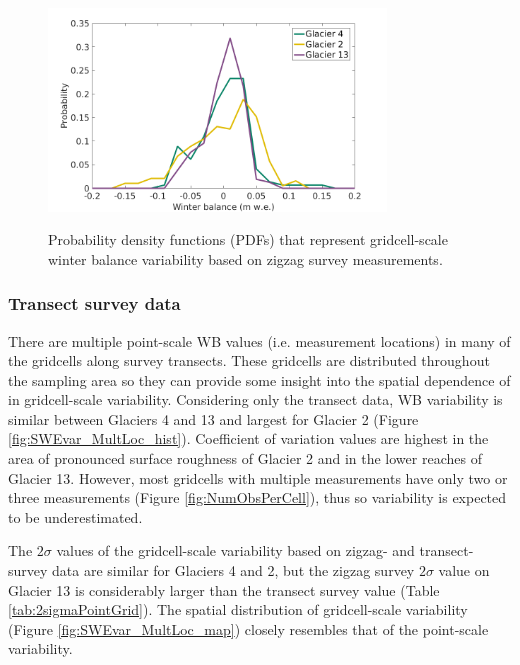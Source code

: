 \documentclass{sfuthesis}
\begin{document}
{\begin{figure}[H]
	\centering
	\includegraphics[width =0.8\textwidth]{ZigzagPDF_G.png}\\
	\caption{Probability density functions (PDFs) that represent gridcell-scale winter balance variability based on zigzag survey measurements.}
	\label{fig:SWEvar_ZZG_hist}
\end{figure}

\subsubsection{Transect survey data}
There are multiple point-scale WB values (i.e. measurement locations) in many of the gridcells along survey transects. These gridcells are distributed throughout the sampling area so they can provide some insight into the spatial dependence of in gridcell-scale variability. Considering only the transect data, WB variability is similar between Glaciers 4 and 13 and largest for Glacier 2 (Figure \ref{fig:SWEvar_MultLoc_hist}). Coefficient of variation values are highest in the area of pronounced surface roughness of Glacier 2 and in the lower reaches of Glacier 13.  However, most gridcells with multiple measurements have only two or three measurements (Figure \ref{fig:NumObsPerCell}), thus so variability is expected to be underestimated. 

The $2\sigma$ values of the gridcell-scale variability based on zigzag- and transect-survey data are similar for Glaciers 4 and 2, but the zigzag survey $2\sigma$ value on Glacier 13 is considerably larger than the transect survey value (Table  \ref{tab:2sigmaPointGrid}). The spatial distribution of gridcell-scale variability (Figure \ref{fig:SWEvar_MultLoc_map}) closely resembles that of the point-scale variability. 

}
\end{document}
